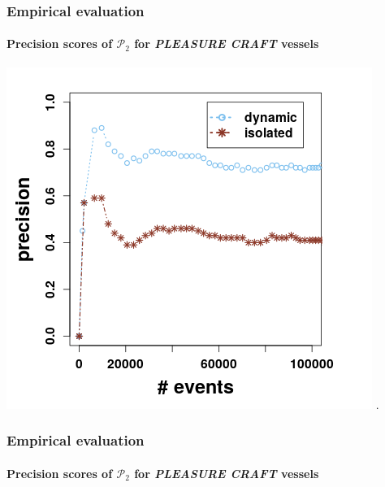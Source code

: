 \begin{frame}
	
	\frametitle{Empirical evaluation }
	\framesubtitle{Precision scores of $\mathcal{P}_2$  for \textit{PLEASURE CRAFT} vessels}
	
	\begin{center}
		\includegraphics[width=.8\textwidth,height=.7\linewidth]{figures/precision_p2.png}
		.
	\end{center}
	
\end{frame}

\begin{frame}
	
	\frametitle{Empirical evaluation }
	\framesubtitle{Precision scores of $\mathcal{P}_2$  for \textit{PLEASURE CRAFT} vessels}
	

	
\end{frame}
